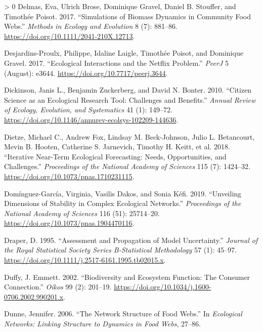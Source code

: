 \documentclass[11pt]{article}
\newlength{\cslhangindent}
\newenvironment{CSLReferences}[3] %
 {%
  \setlength{\parindent}{0pt}
  \ifodd #1 \everypar{\setlength{\hangindent}{\cslhangindent}}\ignorespaces\fi
  \ifnum #2 > 0
  \setlength{\parskip}{#2\baselineskip}
  \fi
 }%
 {}
\begin{document}
\begin{CSLReferences}{1}{0}
\leavevmode\hypertarget{ref-Delmas2017SimBio}{}%
Delmas, Eva, Ulrich Brose, Dominique Gravel, Daniel B. Stouffer, and
Timothée Poisot. 2017. {``Simulations of Biomass Dynamics in Community
Food Webs.''} \emph{Methods in Ecology and Evolution} 8 (7): 881--86.
\url{https://doi.org/10.1111/2041-210X.12713}.

\leavevmode\hypertarget{ref-Desjardins-Proulx2017EcoInt}{}%
Desjardins-Proulx, Philippe, Idaline Laigle, Timothée Poisot, and
Dominique Gravel. 2017. {``Ecological Interactions and the Netflix
Problem.''} \emph{PeerJ} 5 (August): e3644.
\url{https://doi.org/10.7717/peerj.3644}.

\leavevmode\hypertarget{ref-Dickinson2010CitSci}{}%
Dickinson, Janis L., Benjamin Zuckerberg, and David N. Bonter. 2010.
{``Citizen Science as an Ecological Research Tool: Challenges and
Benefits.''} \emph{Annual Review of Ecology, Evolution, and Systematics}
41 (1): 149--72.
\url{https://doi.org/10.1146/annurev-ecolsys-102209-144636}.

\leavevmode\hypertarget{ref-Dietze2018IteNea}{}%
Dietze, Michael C., Andrew Fox, Lindsay M. Beck-Johnson, Julio L.
Betancourt, Mevin B. Hooten, Catherine S. Jarnevich, Timothy H. Keitt,
et al. 2018. {``Iterative Near-Term Ecological Forecasting: Needs,
Opportunities, and Challenges.''} \emph{Proceedings of the National
Academy of Sciences} 115 (7): 1424--32.
\url{https://doi.org/10.1073/pnas.1710231115}.

\leavevmode\hypertarget{ref-Dominguez-Garcia2019UnvDim}{}%
Domínguez-García, Virginia, Vasilis Dakos, and Sonia Kéfi. 2019.
{``Unveiling Dimensions of Stability in Complex Ecological Networks.''}
\emph{Proceedings of the National Academy of Sciences} 116 (51):
25714--20. \url{https://doi.org/10.1073/pnas.1904470116}.

\leavevmode\hypertarget{ref-Draper1995AssPro}{}%
Draper, D. 1995. {``Assessment and Propagation of Model Uncertainty.''}
\emph{Journal of the Royal Statistical Society Series B-Statistical
Methodology} 57 (1): 45--97.
\url{https://doi.org/10.1111/j.2517-6161.1995.tb02015.x}.

\leavevmode\hypertarget{ref-Duffy2002BioEco}{}%
Duffy, J. Emmett. 2002. {``Biodiversity and Ecosystem Function: The
Consumer Connection.''} \emph{Oikos} 99 (2): 201--19.
\url{https://doi.org/10.1034/j.1600-0706.2002.990201.x}.

\leavevmode\hypertarget{ref-Dunne2006NetStr}{}%
Dunne, Jennifer. 2006. {``The Network Structure of Food Webs.''} In
\emph{Ecological Networks: Linking Structure to Dynamics in Food Webs},
27--86.


\end{CSLReferences}
\end{document}
